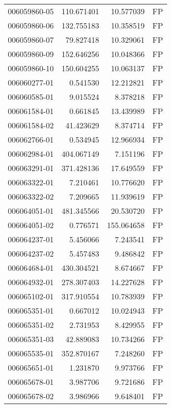\begin{tabular}{lrrl}
006059860-05 &  110.671401 &      10.577039 &   FP \\
006059860-06 &  132.755183 &      10.358519 &   FP \\
006059860-07 &   79.827418 &      10.329061 &   FP \\
006059860-09 &  152.646256 &      10.048366 &   FP \\
006059860-10 &  150.604255 &      10.063137 &   FP \\
006060277-01 &    0.541530 &      12.212821 &   FP \\
006060585-01 &    9.015524 &       8.378218 &   FP \\
006061584-01 &    0.661845 &      13.439989 &   FP \\
006061584-02 &   41.423629 &       8.374714 &   FP \\
006062766-01 &    0.534945 &      12.966934 &   FP \\
006062984-01 &  404.067149 &       7.151196 &   FP \\
006063291-01 &  371.428136 &      17.649559 &   FP \\
006063322-01 &    7.210461 &      10.776620 &   FP \\
006063322-02 &    7.209665 &      11.939619 &   FP \\
006064051-01 &  481.345566 &      20.530720 &   FP \\
006064051-02 &    0.776571 &     155.064658 &   FP \\
006064237-01 &    5.456066 &       7.243541 &   FP \\
006064237-02 &    5.457483 &       9.486842 &   FP \\
006064684-01 &  430.304521 &       8.674667 &   FP \\
006064932-01 &  278.307403 &      14.227628 &   FP \\
006065102-01 &  317.910554 &      10.783939 &   FP \\
006065351-01 &    0.667012 &      10.024943 &   FP \\
006065351-02 &    2.731953 &       8.429955 &   FP \\
006065351-03 &   42.889083 &      10.734266 &   FP \\
006065535-01 &  352.870167 &       7.248260 &   FP \\
006065651-01 &    1.231870 &       9.973766 &   FP \\
006065678-01 &    3.987706 &       9.721686 &   FP \\
006065678-02 &    3.986966 &       9.648401 &   FP \\

\end{tabular}
